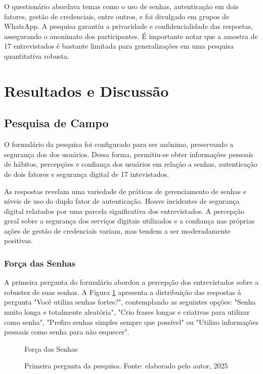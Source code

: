 \documentclass[12pt]{article}
\begin{document}
O questionário abordava temas como o uso de senhas, autenticação em dois
fatores, gestão de credenciais, entre outros, e foi divulgado em grupos de
WhatsApp.
A pesquisa garantiu a privacidade e confidencialidade das respostas,
assegurando o anonimato dos participantes.
É importante notar que a amostra de 17 entrevistados é bastante limitada para
generalizações em uma pesquisa quantitativa robusta.

\section{Resultados e Discussão}

\subsection{Pesquisa de Campo}

O formulário da pesquisa foi configurado para ser anônimo, preservando a segurança dos
dos usuários.
Dessa forma, permitiu-se obter informações pessoais de hábitos, percepções e confiança
dos usuários em relação a senhas, autenticação de dois fatores e segurança digital de
17 intevistados.

As respostas revelam uma variedade de práticas de gerenciamento de senhas e níveis
de uso do duplo fator de autenticação.
Houve incidentes de segurança digital relatados por uma parcela significativa dos
entrevistados.
A percepção geral sobre a segurança dos serviços digitais utilizados e a confiança
nas próprias ações de gestão de credenciais variam, mas tendem a ser moderadamente
positivas.

\subsubsection{Força das Senhas}

A primeira pergunta do formulário abordou a percepção dos entrevistados sobre a robustez
de suas senhas.
A Figura \ref{fig:resposta_1} apresenta a distribuição das respostas à pergunta "Você
utiliza senhas fortes?", contemplando as seguintes opções: "Senha muito longa e
totalmente aleatória", "Crio frases longas e criativas para utilizar como senha",
"Prefiro senhas simples sempre que possível" ou "Utilizo informações pessoais como senha
para não esquecer".

\begin{figure}[!htbp]
  \centering
  \caption*{\normalfont\normalsize Força das Senhas}
  \caption{Primeira pergunta da pesquisa. Fonte: elaborado pelo autor, 2025}
  \label{fig:resposta_1}
\end{figure}
\FloatBarrier
\end{document}
